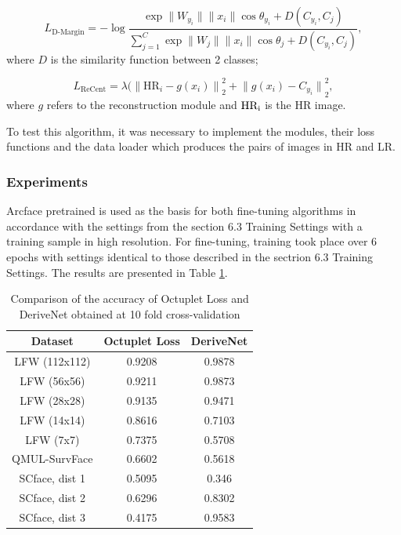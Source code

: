 \documentclass[11pt,a4paper]{article}
\begin{document}
$$L_\textrm{D-Margin} = - \log \frac{\exp{\lVert W_{y_i} \rVert \lVert x_i \rVert \cos \theta_{y_i} + D(C_{y_i}, C_j)}}{\sum_{j=1}^C \exp{\lVert W_j \rVert \lVert x_i \rVert \cos \theta_j + D(C_{y_i}, C_j)}},$$ 
where $D$ is the similarity function between 2 classes; 

$$L_\textrm{ReCent} = \lambda ({\lVert \mathrm{HR}_i - g(x_i) \rVert}_2^2 + {\lVert g(x_i) - C_{y_i} \rVert}_2^2,$$
where $g$ refers to the reconstruction module and ${\rm HR_i}$ is the HR image. 

To test this algorithm, it was necessary to implement the modules, their loss functions and the data loader which produces the pairs of images in HR and LR. 

\subsubsection{Experiments}
Arcface \cite{arcface} pretrained is used as the basis for both fine-tuning algorithms in accordance with the settings from the section 6.3 Training Settings with a training sample in high resolution. For fine-tuning, training took place over 6 epochs with settings identical to those described in the sectrion 6.3 Training Settings. The results are presented in Table \ref{t2}.

\begin{table}[ht!]
\begin{center}
\begin{tabular}{||c | c c||} 
 \hline
 Dataset & Octuplet Loss & DeriveNet \\ [0.5ex] 
 \hline\hline
 LFW (112x112) & 0.9208 & 0.9878  \\ 
 \hline
  LFW (56x56) & 0.9211 & 0.9873 \\
 \hline
  LFW (28x28) & 0.9135 & 0.9471  \\
 \hline
  LFW (14x14) & 0.8616  & 0.7103 \\
 \hline
  LFW (7x7) & 0.7375 & 0.5708 \\ 
  \hline
  QMUL-SurvFace & 0.6602 & 0.5618 \\ 
  \hline
  SCface, dist 1 & 0.5095 & 0.346 \\ 
  \hline
  SCface, dist 2 & 0.6296 & 0.8302 \\ 
  \hline
  SCface, dist 3 & 0.4175 & 0.9583 \\ [1ex] 
 \hline
\end{tabular}
\caption{Comparison of the accuracy of Octuplet Loss and DeriveNet obtained at 10 fold cross-validation}
\label{t2} 
\end{center}
\end{table}
\end{document}
